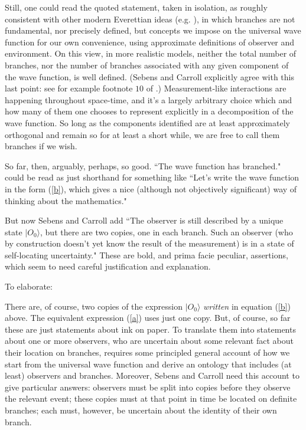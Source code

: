 \documentclass[aps,prl]{revtex4}
\def\ket#1{| #1\rangle}
\begin{document}
Still, one could read the quoted statement, taken in isolation,
as roughly consistent with other modern Everettian ideas 
(e.g. \cite{wallaceontology,wallace2012emergent}),
in which branches are not fundamental, nor precisely defined, but concepts
we impose on the universal wave function for our own convenience,
using approximate definitions of observer and environment.  
On this view, in more realistic models, neither 
the total number of branches, nor
the number of branches associated with any given component
of the wave function, is well defined.  
(Sebens and Carroll explicitly agree with this last
point: see for example footnote $10$ of \cite{cs1}.)
Measurement-like interactions are happening throughout space-time, and it's
a largely arbitrary choice which and how many of them one
chooses to represent explicitly in a decomposition of 
the wave function.   So long as 
the components identified are at least approximately 
orthogonal and remain so for at least a short while, we
are free to call them branches if we wish.

So far, then, arguably, perhaps, so good.   ``The wave function has
branched." could be read as just shorthand for something like ``Let's 
write the wave function in the form (\ref{b}), which gives a nice
(although not objectively significant) way of thinking about the
mathematics."  

But now Sebens and Carroll add ``The observer is still described
by a unique state $\ket{O_0}$, but there are two copies, one in
each branch.   Such an observer (who by construction doesn't
yet know the result of the measurement) is in a state of 
self-locating uncertainty."   
These are bold, and prima facie peculiar, assertions, which seem to need 
careful justification and explanation.  

To elaborate: 
   
There are, of course, two copies of the expression $\ket{O_0}$ 
{\it written} in equation (\ref{b}) above.   
The equivalent expression (\ref{a}) uses
just one copy.   
But, of course, so far these are just statements about ink on paper.  
To translate them into statements about one or more
observers, who are uncertain about
some relevant fact about their location on branches, 
requires some principled 
general account of how we 
start from the universal wave function and 
derive an ontology that includes
(at least) observers and branches. 
Moreover, Sebens and Carroll need 
this account to give particular answers: observers must be split
into copies before they
observe the relevant event; these copies must at that point in time be
located on definite branches; each must, however, be uncertain about 
the identity of their own branch. 
\end{document}
